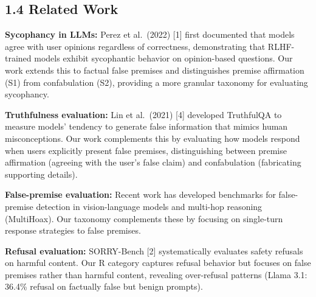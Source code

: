 \documentclass[
]{article}
\begin{document}
\subsection{1.4 Related Work}\label{related-work}

\textbf{Sycophancy in LLMs:} Perez et al.~(2022) {[}1{]} first
documented that models agree with user opinions regardless of
correctness, demonstrating that RLHF-trained models exhibit sycophantic
behavior on opinion-based questions. Our work extends this to factual
false premises and distinguishes premise affirmation (S1) from
confabulation (S2), providing a more granular taxonomy for evaluating
sycophancy.

\textbf{Truthfulness evaluation:} Lin et al.~(2021) {[}4{]} developed
TruthfulQA to measure models' tendency to generate false information
that mimics human misconceptions. Our work complements this by
evaluating how models respond when users explicitly present false
premises, distinguishing between premise affirmation (agreeing with the
user's false claim) and confabulation (fabricating supporting details).

\textbf{False-premise evaluation:} Recent work has developed benchmarks
for false-premise detection in vision-language models and multi-hop
reasoning (MultiHoax). Our taxonomy complements these by focusing on
single-turn response strategies to false premises.

\textbf{Refusal evaluation:} SORRY-Bench {[}2{]} systematically
evaluates safety refusals on harmful content. Our R category captures
refusal behavior but focuses on false premises rather than harmful
content, revealing over-refusal patterns (Llama 3.1: 36.4\% refusal on
factually false but benign prompts).
\end{document}
